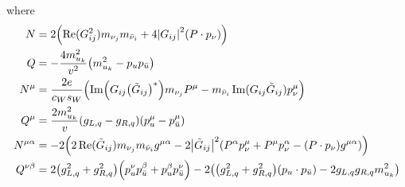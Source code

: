 where
\begin{align}
    N
     & =
    2\qty(
    \Re(G^{2}_{ij})m_{\nu_{j}}m_{\bar{\nu}_{i}}+4\qty|G_{ij}|^{2}\qty(P\cdot p_{\nu})
    )
    \\
    Q
     & = -\frac{4m^{2}_{u_{k}}}{v^{2}}\qty(m^{2}_{u_{k}} - p_{u}p_{\bar{u}})
    \\
    N^{\mu}
     & =
    \frac{2e}{c_{W}s_{W}}\qty(
    \mathrm{Im}\qty(G_{ij}\qty(\tilde{G}_{ij})^{*})m_{\nu_{j}}P^{\mu}
    - m_{\bar{\nu}_{i}}\Im(G_{ij}\tilde{G}_{ij})p^{\mu}_{\nu}
    )
    \\
    Q^{\mu}
     & =
    \frac{2m_{u_{k}}^{2}}{v}\qty(g_{L,q}-g_{R,q})(p^{\mu}_{u}-p^{\mu}_{\bar{u}})
    \\
    N^{\mu\alpha}
     & =
    -2\qty(
    2\Re(\tilde{G}_{ij})m_{\nu_{j}}m_{\bar{\nu}_{i}}g^{\mu\alpha}
    -2\qty|\tilde{G}_{ij}|^{2}\qty(
    P^{\alpha}p^{\mu}_{\nu} +
    P^{\mu}p^{\alpha}_{\nu}-\qty(P\cdot p_{\nu})g^{\mu\alpha}
    )
    )                                                                        \\
    Q^{\nu\beta}
     & =
    2\qty(g^{2}_{L,q} + g^{2}_{R,q})
    \qty(
    p^{\nu}_{u}p^{\beta}_{\bar{u}} +
    p^{\beta}_{u}p^{\nu}_{\bar{u}}
    )
    -2\qty(\qty(g^{2}_{L,q} + g^{2}_{R,q})\qty(p_{u}\cdot p_{\bar{u}})
    -2g_{L,q}g_{R,q}m^{2}_{u_{k}}
    )
\end{align}